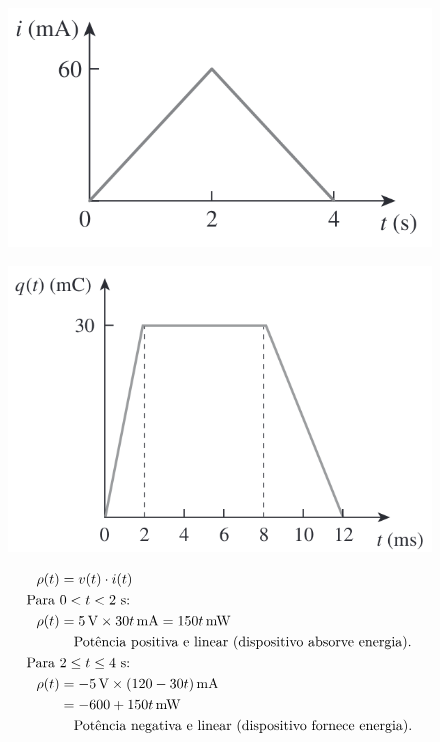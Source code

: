 \begin{enumerate}
\begin{enumerate}
		            \begin{figure}[H]
			            \centering
			            \includegraphics[height=0.15\textwidth]{./fig/fig9.png}
			            \caption{}
			            \label{fig:fig9}
		            \end{figure}
		            \begin{figure}[H]
			            \centering
			            \includegraphics[height=0.15\textwidth]{./fig/fig10.png}
			            \caption{}
			            \label{fig:fig10}
		            \end{figure}

		            \begin{minipage}{\linewidth}
			            \begin{align*}
				            \rho(t)      & = v(t) \cdot i(t)                                                      \\
				            \text{Para } & 0 < t < 2 \text{ s:}                                                   \\
				            \rho(t)      & = 5 \, \text{V} \times 30t \, \text{mA} = 150t \, \text{mW}            \\
				                         & \text{\quad Potência positiva e linear (dispositivo absorve energia).} \\
				            \text{Para } & 2 \leq t \leq 4 \text{ s:}                                             \\
				            \rho(t)      & = -5 \, \text{V} \times (120 - 30t) \, \text{mA}                       \\
				                         & = -600 + 150t \, \text{mW}                                             \\
				                         & \text{\quad Potência negativa e linear (dispositivo fornece energia).} \\
			            \end{align*}
		            \end{minipage}


\end{enumerate}
\end{enumerate}
